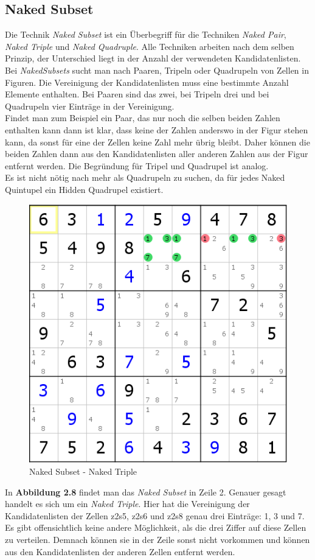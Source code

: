 \newpage
\subsection{Naked Subset}
Die Technik \textit{Naked Subset} ist ein Überbegriff für die Techniken \textit{Naked Pair}, \textit{Naked Triple} und \textit{Naked Quadruple}. Alle Techniken arbeiten nach dem selben Prinzip, der Unterschied liegt in der Anzahl der verwendeten Kandidatenlisten. Bei \textit{NakedSubsets} sucht man nach Paaren, Tripeln oder Quadrupeln von Zellen in Figuren. Die Vereinigung der Kandidatenlisten muss eine bestimmte Anzahl Elemente enthalten. Bei Paaren sind das zwei, bei Tripeln drei und bei Quadrupeln vier Einträge in der Vereinigung.\\
Findet man zum Beispiel ein Paar, das nur noch die selben beiden Zahlen enthalten kann dann ist klar, dass keine der Zahlen anderswo in der Figur stehen kann, da sonst für eine der Zellen keine Zahl mehr übrig bleibt. Daher können die beiden Zahlen dann aus den Kandidatenlisten aller anderen Zahlen aus der Figur entfernt werden.
Die Begründung für Tripel und Quadrupel ist analog.\\
Es ist nicht nötig nach mehr als Quadrupeln zu suchen, da für jedes Naked Quintupel ein Hidden Quadrupel existiert.

\begin{figure}[h]
\begin{center}
\includegraphics{./img/naked_subset.png}
\caption{Naked Subset - Naked Triple}
\end{center}
\end{figure}

\noindent In \textbf{Abbildung 2.8} findet man das \textit{Naked Subset} in Zeile 2. Genauer gesagt handelt es sich um ein \textit{Naked Triple}. Hier hat die Vereinigung der Kandidatenlisten der Zellen z2s5, z2s6 und z2s8 genau drei Einträge: 1, 3 und 7. Es gibt offensichtlich keine andere Möglichkeit, als die drei Ziffer auf diese Zellen zu verteilen. Demnach können sie in der Zeile sonst nicht vorkommen und können aus den Kandidatenlisten der anderen Zellen entfernt werden.
